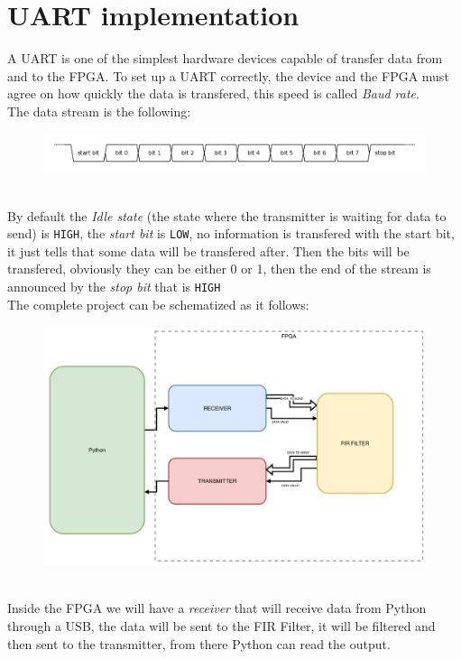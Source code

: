 \documentclass[11pt,a4paper,twocolumn]{IEEEtran}
\begin{document}
	\section{UART implementation}
	A UART is one of the simplest hardware devices capable of transfer data from and to the FPGA.
	To set up a UART correctly, the device and the FPGA must agree on how quickly the data is transfered, this speed is called \emph{Baud rate}.\\
	The data stream is the following:
	\begin{figure}[h]
		\centering
		\includegraphics[width=1\linewidth]{img/baud}
	\end{figure}\\
	By default the \emph{Idle state} (the state where the transmitter is waiting for data to send) is \texttt{HIGH}, the \emph{start bit} is \texttt{LOW}, no information is transfered with the start bit, it just tells that some data will be transfered after. Then the bits will be transfered, obviously they can be either 0 or 1, then the end of the stream is announced by the \emph{stop bit} that is \texttt{HIGH}\medskip\\
	The complete project can be schematized as it follows:
	\begin{figure}[h]
		\centering
		\includegraphics[width=1\linewidth]{img/projectcomplete}
	\end{figure}\\
	Inside the FPGA we will have a \emph{receiver} that will receive data from Python through a USB, the data will be sent to the FIR Filter, it will be filtered and then sent to the transmitter, from there Python can read the output.\\
\end{document}
